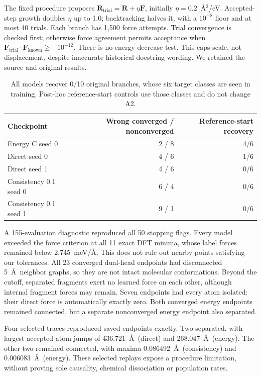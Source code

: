 \documentclass{article}
\begin{document}
The fixed procedure proposes $\mathbf R_{\mathrm{trial}}=\mathbf R+\eta\mathbf F$, initially $\eta=0.2$~\AA$^2$/eV. Accepted-step growth doubles $\eta$ up to 1.0; backtracking halves it, with a $10^{-8}$ floor and at most 40 trials. Each branch has 1,500 force attempts. Trial convergence is checked first; otherwise force agreement permits acceptance when $\mathbf F_{\mathrm{trial}}\cdot\mathbf F_{\mathrm{known}}\geq-10^{-12}$. There is no energy-decrease test. This caps scale, not displacement, despite inaccurate historical docstring wording. We retained the source and original results.
\begin{table}[H]
\centering\small
\caption{All models recover 0/10 original branches, whose six target classes are seen in training. Post-hoc reference-start controls use those classes and do not change A2.}
\begin{tabular}{lrr}\toprule
Checkpoint & Wrong converged / nonconverged & Reference-start recovery\\\midrule
Energy C seed 0 & 2 / 8 & 4/6\\
Direct seed 0 & 4 / 6 & 1/6\\
Direct seed 1 & 4 / 6 & 0/6\\
Consistency 0.1 seed 0 & 6 / 4 & 0/6\\
Consistency 0.1 seed 1 & 9 / 1 & 0/6\\\bottomrule
\end{tabular}
\end{table}
A 155-evaluation diagnostic reproduced all 50 stopping flags. Every model exceeded the force criterion at all 11 exact DFT minima, whose label forces remained below 2.745~meV/\AA. This does not rule out nearby points satisfying our tolerances. All 23 converged dual-head endpoints had disconnected 5~\AA\ neighbor graphs, so they are not intact molecular conformations. Beyond the cutoff, separated fragments exert no learned force on each other, although internal fragment forces may remain. Seven endpoints had every atom isolated: their direct force is automatically exactly zero. Both converged energy endpoints remained connected, but a separate nonconverged energy endpoint also separated.

Four selected traces reproduced saved endpoints exactly. Two separated, with largest accepted atom jumps of 436.721~\AA\ (direct) and 268.047~\AA\ (energy). The other two remained connected, with maxima 0.086492~\AA\ (consistency) and 0.006083~\AA\ (energy). These selected replays expose a procedure limitation, without proving sole causality, chemical dissociation or population rates.
\end{document}

